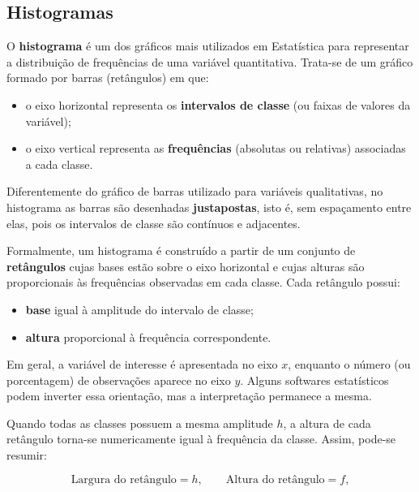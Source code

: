 \newpage
\subsection{Histogramas}

O \textbf{histograma} é um dos gráficos mais utilizados em Estatística
para representar a distribuição de frequências de uma variável quantitativa.
Trata-se de um gráfico formado por barras (retângulos) em que:

\begin{itemize}
    \item o eixo horizontal representa os \textbf{intervalos de classe}
    (ou faixas de valores da variável);
    \item o eixo vertical representa as \textbf{frequências}
    (absolutas ou relativas) associadas a cada classe.
\end{itemize}

\vskip0.3cm

Diferentemente do gráfico de barras utilizado para variáveis qualitativas,
no histograma as barras são desenhadas \textbf{justapostas}, isto é,
sem espaçamento entre elas, pois os intervalos de classe são contínuos e
adjacentes.

\vskip0.3cm

Formalmente, um histograma é construído a partir de um conjunto de
\textbf{retângulos} cujas bases estão sobre o eixo horizontal e cujas alturas
são proporcionais às frequências observadas em cada classe.
Cada retângulo possui:

\begin{itemize}
    \item \textbf{base} igual à amplitude do intervalo de classe;
    \item \textbf{altura} proporcional à frequência correspondente.
\end{itemize}
\vskip0.3cm

Em geral, a variável de interesse é apresentada no eixo $x$,
enquanto o número (ou porcentagem) de observações aparece no eixo $y$.
Alguns softwares estatísticos podem inverter essa orientação,
mas a interpretação permanece a mesma. \vskip0.3cm

Quando todas as classes possuem a mesma amplitude $h$,
a altura de cada retângulo torna-se numericamente igual à frequência da classe.
Assim, pode-se resumir:

\[
\text{Largura do retângulo} = h,
\qquad
\text{Altura do retângulo} = f,
\]

